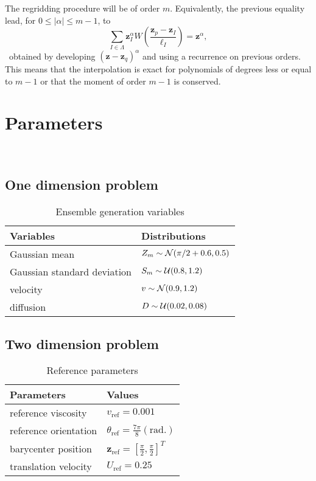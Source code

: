 The regridding procedure will be of order $m$. Equivalently, the previous equality lead, for $0 \leq |\alpha| \leq m - 1$, to
\begin{equation*}
    \sum_{I \in \Lambda} \bm z_I^\alpha W \left(\frac{\bm z_p - \bm z_I}{\ell_I} \right) = \bm z^\alpha,
\end{equation*}~obtained by developing ${(\bm z-\bm z_q)}^\alpha$ and using a recurrence on previous orders. This means that the interpolation is exact for polynomials of degrees less or equal to $m-1$ or that the moment of order $m-1$ is conserved.

\section{Parameters}~\label{appendix:simulation-parameters}

\subsection{One dimension problem}
\begin{table}[htbp]
    \centering
    \caption{Ensemble generation variables}
    \begin{tabular}[t]{|l|l|}
        \hline
        Variables                   & Distributions                              \\
        \hline
        Gaussian mean               & $Z_m \sim  \mathcal{N}(\pi/2 + 0.6, 0.5)$ \\
        Gaussian standard deviation & $S_m \sim\mathcal{U}(0.8, 1.2)$       \\
        velocity                    & $v \sim \mathcal{N}(0.9, 1.2)$        \\
        diffusion                   & $D \sim \mathcal{U}(0.02, 0.08)$          \\
        \hline
    \end{tabular}
    \label{tab:ens_gen_1d}
\end{table}

\subsection{Two dimension problem}
\begin{table}[htbp]
    \centering
    \caption{Reference parameters}
    \begin{tabular}[t]{|l|l|}
        \hline
        Parameters            & Values                                                       \\
        \hline
        reference viscosity   & $v_{\text{ref}} = 0.001$                                     \\
        reference orientation & $\theta_{\text{ref}}  = \frac{7 \pi}{8} (\text{rad.})$       \\
        barycenter position   & $\bm{z}_{\text{ref}} = \left[\frac\pi2, \frac\pi2 \right]^T$ \\
        translation velocity  & $U_{\text{ref}} = 0.25$                                      \\
        \hline
    \end{tabular}
    \label{tab:ref}
\end{table}

